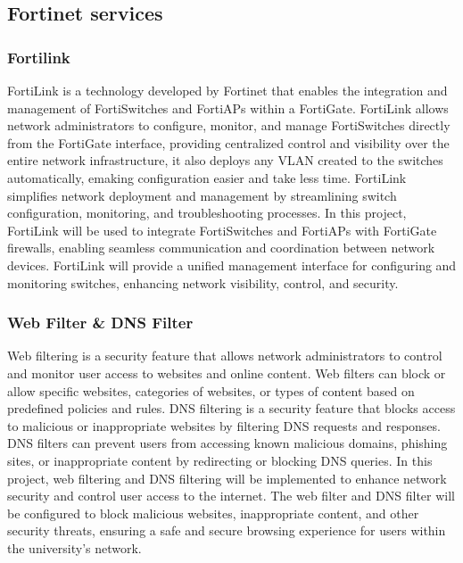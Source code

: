\documentclass[12pt]{report}
\begin{document}
\subsection{Fortinet services}
\subsubsection{Fortilink}
FortiLink is a technology developed by Fortinet that enables the integration and management of FortiSwitches and FortiAPs within a FortiGate. FortiLink allows network administrators to configure, monitor, and manage FortiSwitches directly from the FortiGate interface, providing centralized control and visibility over the entire network infrastructure, it also deploys any VLAN created to the switches automatically, emaking configuration easier and take less time. FortiLink simplifies network deployment and management by streamlining switch configuration, monitoring, and troubleshooting processes. In this project, FortiLink will be used to integrate FortiSwitches and FortiAPs with FortiGate firewalls, enabling seamless communication and coordination between network devices. FortiLink will provide a unified management interface for configuring and monitoring switches, enhancing network visibility, control, and security. %
\subsubsection{Web Filter \& DNS Filter}
Web filtering is a security feature that allows network administrators to control and monitor user access to websites and online content. Web filters can block or allow specific websites, categories of websites, or types of content based on predefined policies and rules. DNS filtering is a security feature that blocks access to malicious or inappropriate websites by filtering DNS requests and responses. DNS filters can prevent users from accessing known malicious domains, phishing sites, or inappropriate content by redirecting or blocking DNS queries. In this project, web filtering and DNS filtering will be implemented to enhance network security and control user access to the internet. The web filter and DNS filter will be configured to block malicious websites, inappropriate content, and other security threats, ensuring a safe and secure browsing experience for users within the university's network. %
\end{document}
